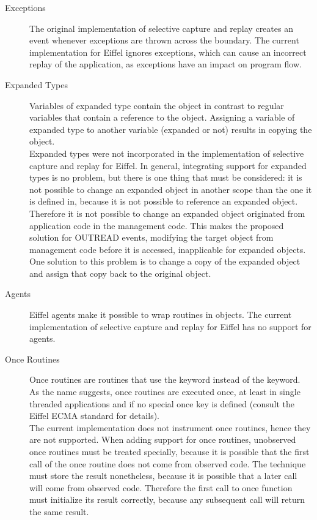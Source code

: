 \begin{description}
 \item [Exceptions] The original implementation of selective capture and replay creates an event whenever exceptions are thrown across the boundary. The current implementation for Eiffel ignores exceptions, which can cause an incorrect replay of the application, as exceptions have an impact on program flow. %

 \item [Expanded Types] Variables of expanded type contain the object in contrast to regular variables that contain a reference to the object. Assigning a variable of expanded type to another variable (expanded or not) results in copying the object.\\
Expanded types were not incorporated in the implementation of selective capture and replay for Eiffel. In general, integrating support for expanded types is no problem, but there is one thing that must be considered: it is not possible to change an expanded object in another scope than the one it is defined in, because it is not possible to reference an expanded object. Therefore it is not possible to change an expanded object originated from application code in the management code. This makes the proposed solution for OUTREAD events, modifying the target object from management code before it is accessed, inapplicable for expanded objects. One solution to this problem is to change a copy of the expanded object and assign that copy back to the original object.

 \item [Agents] Eiffel agents make it possible to wrap routines in objects. The current implementation of selective capture and replay for Eiffel has no support for agents.

 \item [Once Routines] Once routines are routines that use the  keyword instead of the  keyword. As the name suggests, once routines are executed once, at least in single threaded applications and if no special once key is defined (consult the Eiffel ECMA standard \cite{Eiffel-ECMA} for details).\\
The current implementation does not instrument once routines, hence they are not supported. When adding support for once routines, unobserved once routines must be treated specially, because it is possible that the first call of the once routine does not come from observed code. The technique must store the result nonetheless, because it is possible that a later call will come from observed code. Therefore the first call to once function must initialize its result correctly, because any subsequent call will return the same result.
\end{description}

